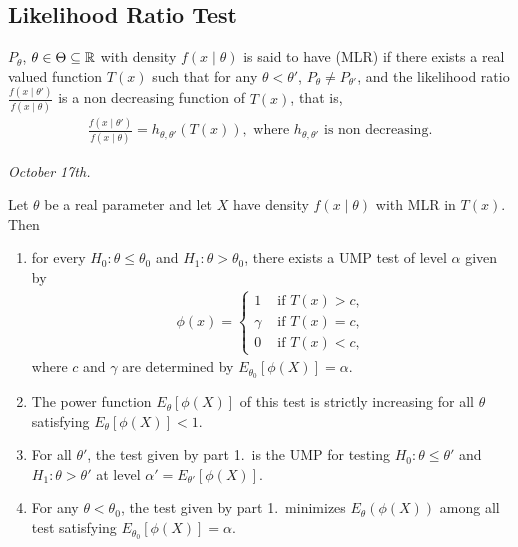 \subsection{Likelihood Ratio Test}

\begin{definition}
    $P_{\theta}$, $\theta \in \Theta \subseteq \mathbb{R}$ with density $f(x \mid \theta)$ is said to have  (MLR) if there exists a real valued function $T(x)$ such that for any $\theta < \theta'$, $P_{\theta} \neq P_{\theta'}$, and the likelihood ratio $\frac{f(x \mid \theta')}{f(x \mid \theta)}$ is a non decreasing function of $T(x)$, that is,
    \begin{align}
        \frac{f(x \mid \theta')}{f(x \mid \theta)} = h_{\theta,\theta'}(T(x)), \text{ where } h_{\theta,\theta'} \text{ is non decreasing}.
    \end{align}
\end{definition}

\textit{October 17th.}


\begin{theorem}
    Let $\theta$ be a real parameter and let $X$ have density $f(x \mid \theta)$ with MLR in $T(x)$. Then
    \begin{enumerate}
        \item for every $H_{0}:\theta \leq \theta_{0}$ and $H_{1}:\theta > \theta_{0}$, there exists a UMP test of level $\alpha$ given by
        \begin{align}
            \phi(x) = \begin{cases}
                1 &\text{ if } T(x) > c,\\
                \gamma &\text{ if } T(x) = c,\\
                0 &\text{ if } T(x) < c,
            \end{cases}
        \end{align}
        where $c$ and $\gamma$ are determined by $E_{\theta_{0}}[\phi(X)] = \alpha$.

        \item The power function $E_{\theta}[\phi(X)]$ of this test is strictly increasing for all $\theta$ satisfying $E_{\theta}[\phi(X)] < 1$.
        \item For all $\theta'$, the test given by part 1.~is the UMP for testing $H_{0}:\theta \leq \theta'$ and $H_{1}:\theta > \theta'$ at level $\alpha' = E_{\theta'}[\phi(X)]$.
        \item For any $\theta < \theta_{0}$, the test given by part 1.~minimizes $E_{\theta}(\phi(X))$ among all test satisfying $E_{\theta_{0}}[\phi(X)] = \alpha$.
    \end{enumerate}
\end{theorem}

